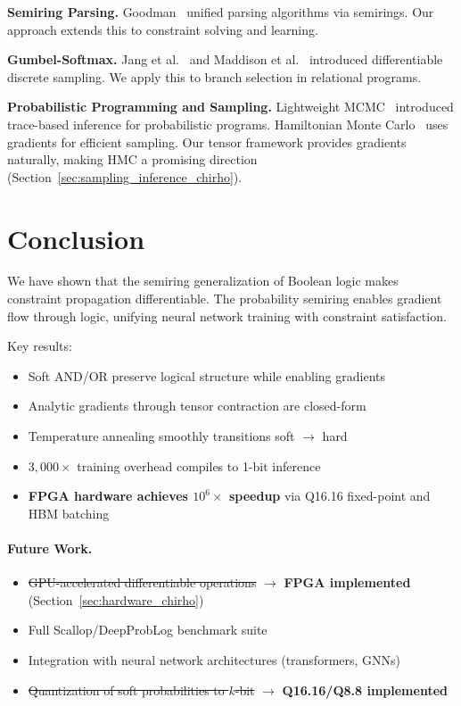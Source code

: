 \documentclass[11pt,a4paper]{article}
\begin{document}
\textbf{Semiring Parsing.}
Goodman~\cite{goodman_semiring_chirho} unified parsing algorithms via semirings.
Our approach extends this to constraint solving and learning.

\textbf{Gumbel-Softmax.}
Jang et al.~\cite{gumbel_softmax_chirho} and Maddison et al.~\cite{concrete_chirho} introduced differentiable discrete sampling.
We apply this to branch selection in relational programs.

\textbf{Probabilistic Programming and Sampling.}
Lightweight MCMC~\cite{lightweight_mcmc_chirho} introduced trace-based inference for probabilistic programs.
Hamiltonian Monte Carlo~\cite{hmc_chirho} uses gradients for efficient sampling.
Our tensor framework provides gradients naturally, making HMC a promising direction (Section~\ref{sec:sampling_inference_chirho}).

\section{Conclusion}
\label{sec:conclusion_chirho}

We have shown that the semiring generalization of Boolean logic makes constraint propagation differentiable.
The probability semiring enables gradient flow through logic, unifying neural network training with constraint satisfaction.

Key results:
\begin{itemize}
  \item Soft AND/OR preserve logical structure while enabling gradients
  \item Analytic gradients through tensor contraction are closed-form
  \item Temperature annealing smoothly transitions soft $\to$ hard
  \item $3{,}000\times$ training overhead compiles to 1-bit inference
  \item \textbf{FPGA hardware achieves $10^6\times$ speedup} via Q16.16 fixed-point and HBM batching
\end{itemize}

\paragraph{Future Work.}
\begin{itemize}
  \item \sout{GPU-accelerated differentiable operations} $\to$ \textbf{FPGA implemented} (Section~\ref{sec:hardware_chirho})
  \item Full Scallop/DeepProbLog benchmark suite
  \item Integration with neural network architectures (transformers, GNNs)
  \item \sout{Quantization of soft probabilities to $k$-bit} $\to$ \textbf{Q16.16/Q8.8 implemented}
\end{itemize}
\end{document}
